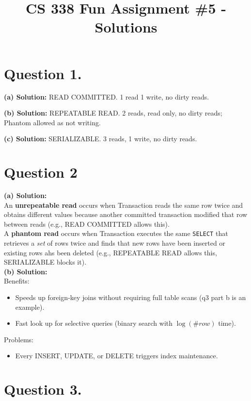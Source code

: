 \documentclass{article}
\title{CS 338 Fun Assignment \#5 - Solutions}
\author{}
\date{}
\begin{document}
\maketitle

\section*{Question 1.}

\textbf{(a) Solution:}
READ COMMITTED. 1 read 1 write, no dirty reads.

\textbf{(b) Solution:}
REPEATABLE READ. 2 reads, read only, no dirty reads; Phantom allowed as not writing.

\textbf{(c) Solution:}
SERIALIZABLE. 3 reads, 1 write, no dirty reads.

\newpage
\section*{Question 2}
\textbf{(a) Solution:}\\ 
An \textbf{unrepeatable read} occurs when Transaction reads the same row twice and 
obtains different values because another committed transaction modified that row between
reads (e.g., READ COMMITTED allows this). \\

A \textbf{phantom read} occurs when Transaction executes the same \texttt{SELECT} that 
retrieves a \emph{set} of rows twice and finds that new rows have been inserted or existing rows 
ahs been deleted (e.g., REPEATABLE READ allows this, SERIALIZABLE blocks it).\\

\textbf{(b) Solution:}\\
Benefits:
\begin{itemize}[nosep]
  \item Speeds up foreign‐key joins without requiring full table scans (q3 part b is an example).
  \item Fast look up for selective queries (binary search with \(\log(\#row)\) time).
\end{itemize}

Problems:
\begin{itemize}[nosep]
  \item Every INSERT, UPDATE, or DELETE triggers index maintenance. 
\end{itemize}


\newpage
\section*{Question 3.}
\end{document}
